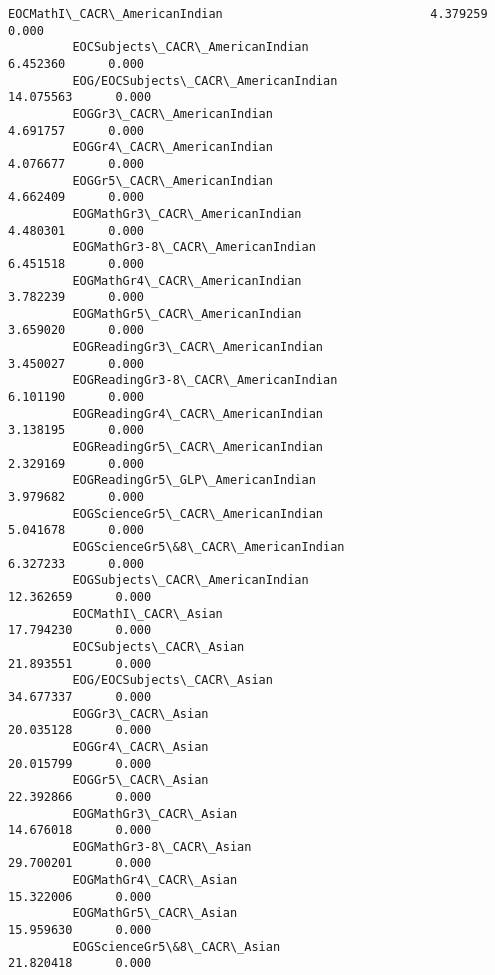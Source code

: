 \documentclass[11pt]{article}
\begin{document}
\begin{Verbatim}[commandchars=\\\{\}]
         EOCMathI\_CACR\_AmericanIndian                             4.379259      0.000   
         EOCSubjects\_CACR\_AmericanIndian                          6.452360      0.000   
         EOG/EOCSubjects\_CACR\_AmericanIndian                     14.075563      0.000   
         EOGGr3\_CACR\_AmericanIndian                               4.691757      0.000   
         EOGGr4\_CACR\_AmericanIndian                               4.076677      0.000   
         EOGGr5\_CACR\_AmericanIndian                               4.662409      0.000   
         EOGMathGr3\_CACR\_AmericanIndian                           4.480301      0.000   
         EOGMathGr3-8\_CACR\_AmericanIndian                         6.451518      0.000   
         EOGMathGr4\_CACR\_AmericanIndian                           3.782239      0.000   
         EOGMathGr5\_CACR\_AmericanIndian                           3.659020      0.000   
         EOGReadingGr3\_CACR\_AmericanIndian                        3.450027      0.000   
         EOGReadingGr3-8\_CACR\_AmericanIndian                      6.101190      0.000   
         EOGReadingGr4\_CACR\_AmericanIndian                        3.138195      0.000   
         EOGReadingGr5\_CACR\_AmericanIndian                        2.329169      0.000   
         EOGReadingGr5\_GLP\_AmericanIndian                         3.979682      0.000   
         EOGScienceGr5\_CACR\_AmericanIndian                        5.041678      0.000   
         EOGScienceGr5\&8\_CACR\_AmericanIndian                      6.327233      0.000   
         EOGSubjects\_CACR\_AmericanIndian                         12.362659      0.000   
         EOCMathI\_CACR\_Asian                                     17.794230      0.000   
         EOCSubjects\_CACR\_Asian                                  21.893551      0.000   
         EOG/EOCSubjects\_CACR\_Asian                              34.677337      0.000   
         EOGGr3\_CACR\_Asian                                       20.035128      0.000   
         EOGGr4\_CACR\_Asian                                       20.015799      0.000   
         EOGGr5\_CACR\_Asian                                       22.392866      0.000   
         EOGMathGr3\_CACR\_Asian                                   14.676018      0.000   
         EOGMathGr3-8\_CACR\_Asian                                 29.700201      0.000   
         EOGMathGr4\_CACR\_Asian                                   15.322006      0.000   
         EOGMathGr5\_CACR\_Asian                                   15.959630      0.000   
         EOGScienceGr5\&8\_CACR\_Asian                              21.820418      0.000   

\end{Verbatim}
\end{document}
